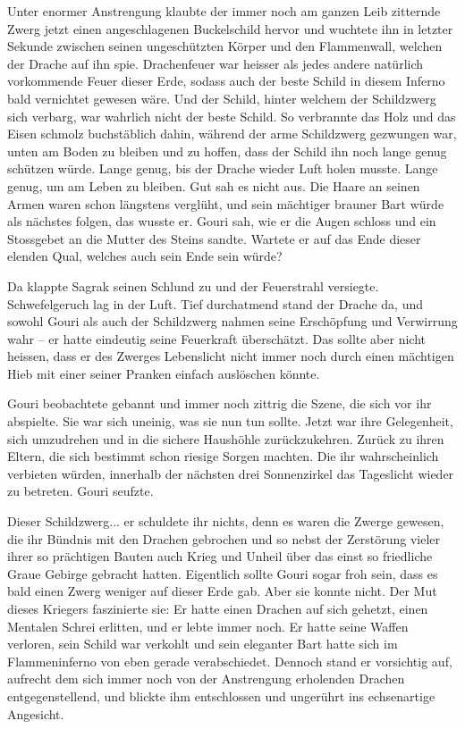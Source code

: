 \documentclass[10pt, a4paper, oneside]{book}
\begin{document}
Unter enormer Anstrengung klaubte der immer noch am ganzen Leib zitternde Zwerg jetzt einen angeschlagenen Buckelschild hervor und wuchtete ihn in letzter Sekunde zwischen seinen ungeschützten Körper und den Flammenwall, welchen der Drache auf ihn spie. Drachenfeuer war heisser als jedes andere natürlich vorkommende Feuer dieser Erde, sodass auch der beste Schild in diesem Inferno bald vernichtet gewesen wäre. Und der Schild, hinter welchem der Schildzwerg sich verbarg, war wahrlich nicht der beste Schild. So verbrannte das Holz und das Eisen schmolz buchstäblich dahin, während der arme Schildzwerg gezwungen war, unten am Boden zu bleiben und zu hoffen, dass der Schild ihn noch lange genug schützen würde. Lange genug, bis der Drache wieder Luft holen musste. Lange genug, um am Leben zu bleiben. Gut sah es nicht aus. Die Haare an seinen Armen waren schon längstens verglüht, und sein mächtiger brauner Bart würde als nächstes folgen, das wusste er. Gouri sah, wie er die Augen schloss und ein Stossgebet an die Mutter des Steins sandte. Wartete er auf das Ende dieser elenden Qual, welches auch sein Ende sein würde?

Da klappte Sagrak seinen Schlund zu und der Feuerstrahl versiegte. Schwefelgeruch lag in der Luft. Tief durchatmend stand der Drache da, und sowohl Gouri als auch der Schildzwerg nahmen seine Erschöpfung und Verwirrung wahr – er hatte eindeutig seine Feuerkraft überschätzt. Das sollte aber nicht heissen, dass er des Zwerges Lebenslicht nicht immer noch durch einen mächtigen Hieb mit einer seiner Pranken einfach auslöschen könnte.

Gouri beobachtete gebannt und immer noch zittrig die Szene, die sich vor ihr abspielte. Sie war sich uneinig, was sie nun tun sollte. Jetzt war ihre Gelegenheit, sich umzudrehen und in die sichere Haushöhle zurückzukehren. Zurück zu ihren Eltern, die sich bestimmt schon riesige Sorgen machten. Die ihr wahrscheinlich verbieten würden, innerhalb der nächsten drei Sonnenzirkel das Tageslicht wieder zu betreten. Gouri seufzte.

Dieser Schildzwerg... er schuldete ihr nichts, denn es waren die Zwerge gewesen, die ihr Bündnis mit den Drachen gebrochen und so nebst der Zerstörung vieler ihrer so prächtigen Bauten auch Krieg und Unheil über das einst so friedliche Graue Gebirge gebracht hatten. Eigentlich sollte Gouri sogar froh sein, dass es bald einen Zwerg weniger auf dieser Erde gab. Aber sie konnte nicht. Der Mut dieses Kriegers faszinierte sie: Er hatte einen Drachen auf sich gehetzt, einen Mentalen Schrei erlitten, und er lebte immer noch. Er hatte seine Waffen verloren, sein Schild war verkohlt und sein eleganter Bart hatte sich im Flammeninferno von eben gerade verabschiedet. Dennoch stand er vorsichtig auf, aufrecht dem sich immer noch von der Anstrengung erholenden Drachen entgegenstellend, und blickte ihm entschlossen und ungerührt ins echsenartige Angesicht.
\end{document}
